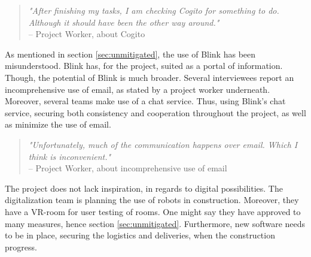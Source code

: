 \begin{quote}
    \textit{"After finishing my tasks, I am checking Cogito for something to do. Although it should have been the other way around."} \\
    – Project Worker, about Cogito
\end{quote}

As mentioned in section \ref{sec:unmitigated}, the use of Blink has been misunderstood. Blink has, for the project, suited as a portal of information. Though, the potential of Blink is much broader. Several interviewees report an incomprehensive use of email, as stated by a project worker underneath. Moreover, several teams make use of a chat service. Thus, using Blink's chat service, securing both consistency and cooperation throughout the project, as well as minimize the use of email. 

\begin{quote}
    \textit{"Unfortunately, much of the communication happens over email. Which I think is inconvenient."}\\
    – Project Worker, about incomprehensive use of email
\end{quote}

The project does not lack inspiration, in regards to digital possibilities. The digitalization team is planning the use of robots in construction. Moreover, they have a VR-room for user testing of rooms. One might say they have approved to many measures, hence section \ref{sec:unmitigated}. Furthermore, new software needs to be in place, securing the logistics and deliveries, when the construction progress. 
\cleardoublepage